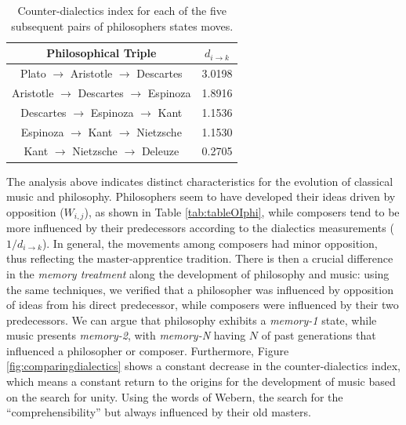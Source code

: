 \documentclass[
 aip,
 jmp,
 amsmath,amssymb,
 reprint,
]{revtex4-1}
\begin{document}
\begin{table}
  \caption{\label{tab:tableEphi}Counter-dialectics index for each of
    the five subsequent pairs of philosophers states moves.}
  \begin{tabular}{|c||c|}
    \hline
    Philosophical Triple & $d_{i \rightarrow k}$ \\
    \hline \hline
    Plato $\rightarrow$ Aristotle $\rightarrow$ Descartes    & 3.0198 \\
    Aristotle $\rightarrow$ Descartes $\rightarrow$ Espinoza & 1.8916 \\
    Descartes $\rightarrow$ Espinoza $\rightarrow$ Kant      & 1.1536 \\
    Espinoza $\rightarrow$ Kant $\rightarrow$ Nietzsche      & 1.1530 \\
    Kant $\rightarrow$ Nietzsche $\rightarrow$ Deleuze       & 0.2705 \\
    \hline
  \end{tabular}
\end{table}

The analysis above indicates distinct characteristics for the
evolution of classical music and philosophy. Philosophers seem to have
developed their ideas driven by opposition ($W_{i,j}$), as shown in
Table \ref{tab:tableOIphi}, while composers tend to be more influenced
by their predecessors according to the dialectics measurements
($1/d_{i \rightarrow k}$). In general, the movements among composers
had minor opposition, thus reflecting the master-apprentice
tradition. There is then a crucial difference in the \textit{memory
  treatment} along the development of philosophy and music: using the
same techniques, we verified that a philosopher was influenced by
opposition of ideas from his direct predecessor, while composers were
influenced by their two predecessors. We can argue that philosophy
exhibits a \textit{memory-1} state, while music presents
\textit{memory-2}, with \textit{memory-N} having $N$ of past
generations that influenced a philosopher or composer. Furthermore,
Figure \ref{fig:comparingdialectics} shows a constant decrease in the
counter-dialectics index, which means a constant return to the origins
for the development of music based on the search for unity. Using the
words of Webern, the search for the ``comprehensibility'' but always
influenced by their old masters.
\end{document}
